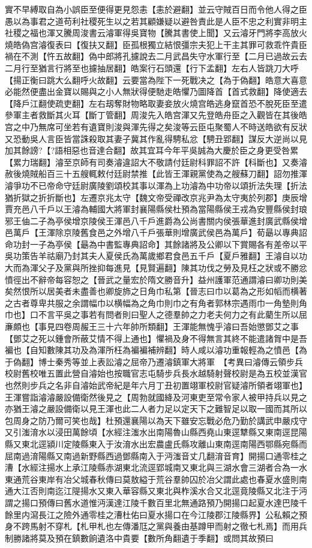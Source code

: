 實不早縛取自為小誤臣至便得更見怨恚【恚於避翻】並云守賊百日而令他人得之臣愚以為事君之道苟利社稷死生以之若其顧嫌疑以避咎責此是人臣不忠之利實非明主社稷之福也渾又騰周浚書云濬軍得吳寶物【騰其書使上聞】又云濬牙門將李高放火燒皓偽宫濬復表曰【復扶又翻】臣孤根獨立結恨彊宗夫犯上干主其罪可救乖忤貴臣禍在不測【忤五故翻】偽中郎將孔攄說去二月武昌失守水軍行至【二月已過故云去二月行至猶言行將至也攄抽居翻】皓案行石頭還【行下孟翻】左右人皆跳刀大呼【揚正衡曰跳大么翻呼火故翻】云要當為陛下一死戰决之【為于偽翻】皓意大喜意必能然便盡出金寶以賜與之小人無狀得便馳走皓懼乃圖降首【首式救翻】降使適去【降戶江翻使疏吏翻】左右刼奪財物略取妻妾放火燒宫皓逃身竄首恐不脫死臣至遣參軍主者救斷其火耳【斷丁管翻】周浚先入皓宫渾又先登皓舟臣之入觀皆在其後皓宫之中乃無席可坐若有遺寶則浚與渾先得之矣浚等云臣屯聚蜀人不時送皓欲有反狀又恐動吳人言臣皆當誅殺取其妻子冀其作亂得騁私忿【騁丑郢翻】謀反大逆尚以見加其餘謗?【?語相惡也音達合翻】故其宜耳今年平吳誠為大慶於臣之身更受咎累【累力瑞翻】濬至京師有司奏濬違詔大不敬請付廷尉科罪詔不許【科斷也】又奏濬赦後燒賊船百三十五艘輒敕付廷尉禁推【此皆王渾親黨使為之艘蘇刀翻】詔勿推渾濬爭功不已帝命守廷尉廣陵劉頌校其事以渾為上功濬為中功帝以頌折法失理【折法猶折獄之折折斷也】左遷京兆太守【魏文帝受禪改京兆尹為太守夷於列郡】庚辰增賈充邑八千戶以王濬為輔國大將軍封襄陽縣侯杜預為當陽縣侯王戎為安豐縣侯封琅邪王伷二子為亭侯增京陵侯王渾邑八千戶進爵為公尚書關内侯張華進封廣武縣侯增邑萬戶【王渾除京陵舊食邑之外增八千戶張華則增廣武侯邑為萬戶】荀朂以專典詔命功封一子為亭侯【朂為中書監專典詔命】其餘諸將及公卿以下賞賜各有差帝以平吳功策告羊祜廟乃封其夫人夏侯氏為萬歲鄉君食邑五千戶【夏戶雅翻】王濬自以功大而為渾父子及黨與所挫抑每進見【見賢遍翻】陳其功伐之勞及見枉之狀或不勝忿憤徑出不辭帝每容恕之【晉武之量宏於隋文勝音升】益州護軍范通謂濬曰卿功則美矣然恨所以居美者未盡善也卿旋斾之日角巾私第【晉志曰巾以葛為之形如幍而横著之古者尊卑共服之余謂幅巾以横幅為之角巾則巾之有角者郭林宗遇雨巾一角墊則角巾也】口不言平吳之事若有問者則曰聖人之德羣帥之力老夫何力之有此藺生所以屈亷頗也【事見四卷周赧王三十六年帥所類翻】王渾能無愧乎濬曰吾始懲鄧艾之事【鄧艾之死以鍾會所蔽艾情不得上通也】懼禍及身不得無言其終不能遣諸胷中是吾褊也【自知數陳其功及為渾所枉為褊褊補辨翻】時人咸以濬功重報輕為之憤邑【為于偽翻】博士秦秀等並上表訟濬之屈帝乃遷濬鎮軍大將軍　【考異曰濬傳云領步兵校尉舊校唯五置此營自濬始也按職官志屯騎步兵長水越騎射聲校尉是為五校並漢官也然則步兵之名非自濬始武帝紀是年六月丁丑初置翊軍校尉官疑濬所領者翊軍也】王渾嘗詣濬濬嚴設備衛然後見之【周勃就國絳及河東吏至常令家人被甲持兵以見之亦猶王濬之嚴設備衛以見王渾也此二人者力足以定天下之難智足以取一國而其所以包周身之防乃爾可笑也哉】杜預還襄陽以為天下雖安忘戰必危乃勤於講武申嚴戍守又引滍淯水以浸田萬餘頃【水經注滍水出南陽魯山縣西堯山東逕犨縣又東南逕昆陽縣又東北逕潁川定陵縣東入于汝淯水出宏農盧氏縣攻離山東南逕南陽西鄂縣宛縣而屈南過淯陽縣又南過新野縣西過鄧縣南入于沔滍音丈几翻淯音育】開揚口通零桂之漕【水經注揚水上承江陵縣赤湖東北流逕郢城南又東北與三湖水會三湖者合為一水東通荒谷東岸有冶父城春秋傳曰莫敖縊于荒谷羣帥囚於冶父謂此處也春夏水盛則南通大江否則南迄江隄揚水又東入華容縣又東北與柞溪水合又北逕竟陵縣又北注于沔謂之揚口預傳曰舊水道惟沔漢達江陵千數百里北無通路預乃開揚口起夏水達巴陵千餘里内瀉長江之險外通零桂之漕杜佑曰夏水揚口在今江陵郡江陵縣界】公私賴之預身不跨馬射不穿札【札甲札也左傳潘尫之黨與養由基蹲甲而射之徹七札焉】而用兵制勝諸將莫及預在鎮數餉遺洛中貴要【數所角翻遺于季翻】或問其故預曰